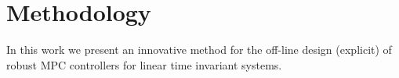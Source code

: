 \section{Methodology}
In this work we present an innovative method for the off-line design (explicit) of robust MPC controllers for linear time invariant systems.











%

